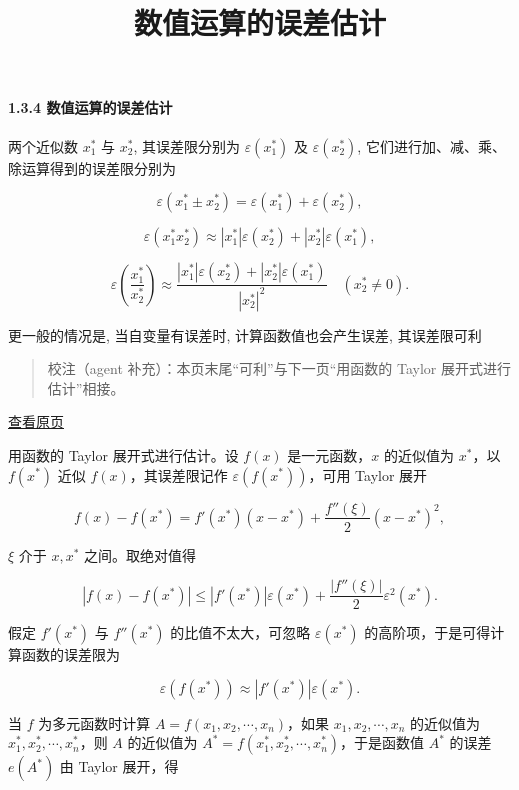 \documentclass[
  10pt,
  fontset=fandol]{ctexart}
\title{数值运算的误差估计}
\author{}
\date{}
\begin{document}
\maketitle

\paragraph{1.3.4 数值运算的误差估计}\label{ux6570ux503cux8fd0ux7b97ux7684ux8befux5deeux4f30ux8ba1}

两个近似数 \(x_1^*\) 与 \(x_2^*\), 其误差限分别为 \(\varepsilon(x_1^*)\) 及 \(\varepsilon(x_2^*)\), 它们进行加、减、乘、除运算得到的误差限分别为

\[
\varepsilon(x_1^* \pm x_2^*) = \varepsilon(x_1^*) + \varepsilon(x_2^*),
\]

\[
\varepsilon(x_1^* x_2^*) \approx |x_1^*| \varepsilon(x_2^*) + |x_2^*| \varepsilon(x_1^*),
\]

\[
\varepsilon\left(\frac{x_1^*}{x_2^*}\right) \approx \frac{|x_1^*| \varepsilon(x_2^*) + |x_2^*| \varepsilon(x_1^*)}{|x_2^*|^2} \quad (x_2^* \neq 0).
\]

更一般的情况是, 当自变量有误差时, 计算函数值也会产生误差, 其误差限可利

\begin{quote}
校注（agent 补充）：本页末尾``可利''与下一页``用函数的 Taylor 展开式进行估计''相接。
\end{quote}

\href{../../source-images/pdf-021.jpeg}{查看原页}

用函数的 Taylor 展开式进行估计。设 \(f(x)\) 是一元函数，\(x\) 的近似值为 \(x^*\)，以 \(f(x^*)\) 近似 \(f(x)\)，其误差限记作 \(\varepsilon(f(x^*))\)，可用 Taylor 展开

\[
f(x)-f(x^*)=f'(x^*)(x-x^*)+\frac{f''(\xi)}{2}(x-x^*)^2,
\]

\(\xi\) 介于 \(x,x^*\) 之间。取绝对值得

\[
|f(x)-f(x^*)|\leqslant |f'(x^*)|\varepsilon(x^*)+\frac{|f''(\xi)|}{2}\varepsilon^2(x^*).
\]

假定 \(f'(x^*)\) 与 \(f''(x^*)\) 的比值不太大，可忽略 \(\varepsilon(x^*)\) 的高阶项，于是可得计算函数的误差限为

\[
\varepsilon(f(x^*))\approx |f'(x^*)|\varepsilon(x^*).
\]

当 \(f\) 为多元函数时计算 \(A=f(x_1,x_2,\cdots,x_n)\)，如果 \(x_1,x_2,\cdots,x_n\) 的近似值为 \(x_1^*,x_2^*,\cdots,x_n^*\)，则 \(A\) 的近似值为 \(A^*=f(x_1^*,x_2^*,\cdots,x_n^*)\)，于是函数值 \(A^*\) 的误差 \(e(A^*)\) 由 Taylor 展开，得
\end{document}

